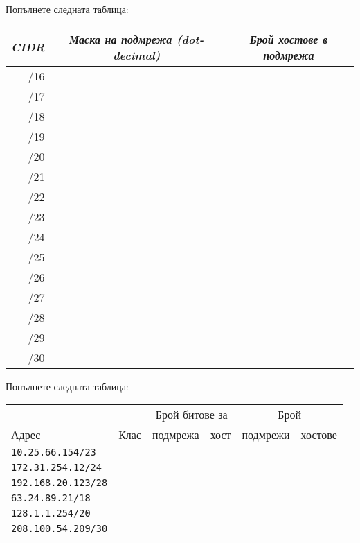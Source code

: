 \begin{q}
  Попълнете следната таблица:

  \begin{center}
    \begin{tabular}{ r c c } \toprule
      \textbf{\emph{CIDR}} & \textbf{\emph{Маска на подмрежа (dot-decimal)}} &
        \textbf{\emph{Брой хостове в подмрежа}} \\ \midrule
      /16 & & \\ \hline
      /17 & & \\ \hline
      /18 & & \\ \hline
      /19 & & \\ \hline
      /20 & & \\ \hline
      /21 & & \\ \hline
      /22 & & \\ \hline
      /23 & & \\ \hline
      /24 & & \\ \hline
      /25 & & \\ \hline
      /26 & & \\ \hline
      /27 & & \\ \hline
      /28 & & \\ \hline
      /29 & & \\ \hline
      /30 & & \\ \bottomrule
    \end{tabular}
  \end{center}
\end{q}

\begin{q}
  Попълнете следната таблица:

  \begin{center}
    \begin{tabular}{@{}lc p{2cm} p{2cm} c c@{}} \toprule
      & & \multicolumn{2}{c}{Брой битове за} & \multicolumn{2}{c}{Брой} \\
      Адрес & Клас & \centering подмрежа & \centering хост & подмрежи & хостове
      \\ \midrule
      \texttt{10.25.66.154/23} & & & & & \\
      \texttt{172.31.254.12/24} & & & & & \\
      \texttt{192.168.20.123/28} & & & & & \\
      \texttt{63.24.89.21/18} & & & & & \\
      \texttt{128.1.1.254/20} & & & & & \\
      \texttt{208.100.54.209/30} & & & & \\ \bottomrule
    \end{tabular}
  \end{center}
\end{q}

